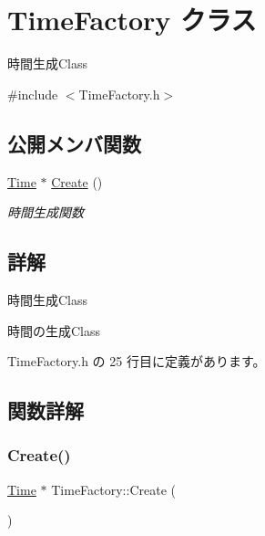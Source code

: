 \hypertarget{class_time_factory}{}\section{Time\+Factory クラス}
\label{class_time_factory}


時間生成\+Class  




{\ttfamily \#include $<$Time\+Factory.\+h$>$}

\subsection*{公開メンバ関数}
\begin{DoxyCompactItemize}
\item 
\mbox{\hyperlink{class_time}{Time}} $\ast$ \mbox{\hyperlink{class_time_factory_adf92110800ea8fd65862ededa7b6b23f}{Create}} ()
\begin{DoxyCompactList}\small\item\em 時間生成関数 \end{DoxyCompactList}\end{DoxyCompactItemize}


\subsection{詳解}
時間生成\+Class 

時間の生成\+Class 

 Time\+Factory.\+h の 25 行目に定義があります。



\subsection{関数詳解}
\mbox{\label{class_time_factory_adf92110800ea8fd65862ededa7b6b23f}} 
\subsubsection{\texorpdfstring{Create()}{Create()}}
{\footnotesize\ttfamily \mbox{\hyperlink{class_time}{Time}} $\ast$ Time\+Factory\+::\+Create (\begin{DoxyParamCaption}{ }\end{DoxyParamCaption})}



